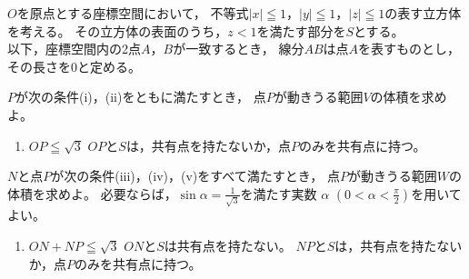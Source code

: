 \documentclass[../../main.tex]{subfiles}
\begin{document}
$O$を原点とする座標空間において，
不等式$|x|\leqq1$，$|y|\leqq1$，$|z|\leqq1$の表す立方体を考える。
その立方体の表面のうち，$z<1$を満たす部分を$S$とする。\\
以下，座標空間内の2点$A$，$B$が一致するとき，
線分$AB$は点$A$を表すものとし，その長さを0と定める。
\begin{enumerate}
  $P$が次の条件(i)，(ii)をともに満たすとき，
    点$P$が動きうる範囲$V$の体積を求めよ。
    \begin{enumerate}
      \item$OP\leqq\sqrt3$
      $OP$と$S$は，共有点を持たないか，点$P$のみを共有点に持つ。
    \end{enumerate}
  $N$と点$P$が次の条件(iii)，(iv)，(v)をすべて満たすとき，
    点$P$が動きうる範囲$W$の体積を求めよ。
    必要ならば，$\displaystyle \sin\alpha=\frac{1}{\sqrt3}$を満たす実数
    $\alpha$ $\displaystyle \left( 0<\alpha<\frac{\pi}{2} \right)$を用いてよい。
    \begin{enumerate}
      \item$ON+NP\leqq\sqrt3$
      $ON$と$S$は共有点を持たない。
      $NP$と$S$は，共有点を持たないか，点$P$のみを共有点に持つ。
    \end{enumerate}
\end{enumerate}
\end{document}
